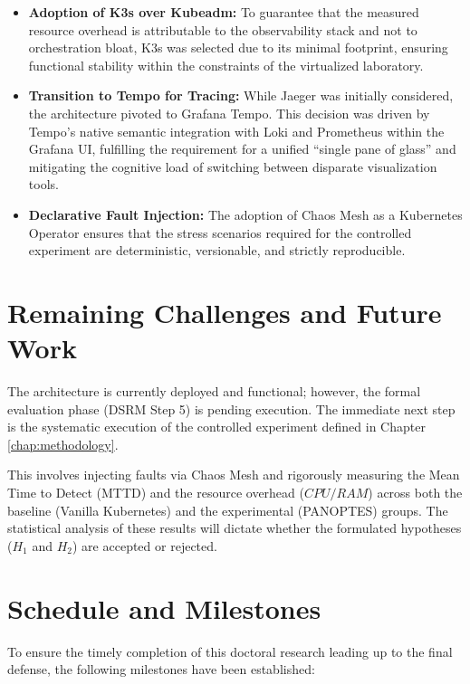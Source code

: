 \begin{itemize}
    \item \textbf{Adoption of K3s over Kubeadm:} To guarantee that the measured resource overhead is attributable to the observability stack and not to orchestration bloat, K3s was selected due to its minimal footprint, ensuring functional stability within the constraints of the virtualized laboratory.
    \item \textbf{Transition to Tempo for Tracing:} While Jaeger was initially considered, the architecture pivoted to Grafana Tempo. This decision was driven by Tempo's native semantic integration with Loki and Prometheus within the Grafana UI, fulfilling the requirement for a unified ``single pane of glass'' and mitigating the cognitive load of switching between disparate visualization tools.
    \item \textbf{Declarative Fault Injection:} The adoption of Chaos Mesh as a Kubernetes Operator ensures that the stress scenarios required for the controlled experiment are deterministic, versionable, and strictly reproducible.
\end{itemize}

\section{Remaining Challenges and Future Work}

The architecture is currently deployed and functional; however, the formal evaluation phase (DSRM Step 5) is pending execution. The immediate next step is the systematic execution of the controlled experiment defined in Chapter \ref{chap:methodology}. 

This involves injecting faults via Chaos Mesh and rigorously measuring the Mean Time to Detect (MTTD) and the resource overhead ($CPU/RAM$) across both the baseline (Vanilla Kubernetes) and the experimental (PANOPTES) groups. The statistical analysis of these results will dictate whether the formulated hypotheses ($H_1$ and $H_2$) are accepted or rejected.

\section{Schedule and Milestones}

To ensure the timely completion of this doctoral research leading up to the final defense, the following milestones have been established:

